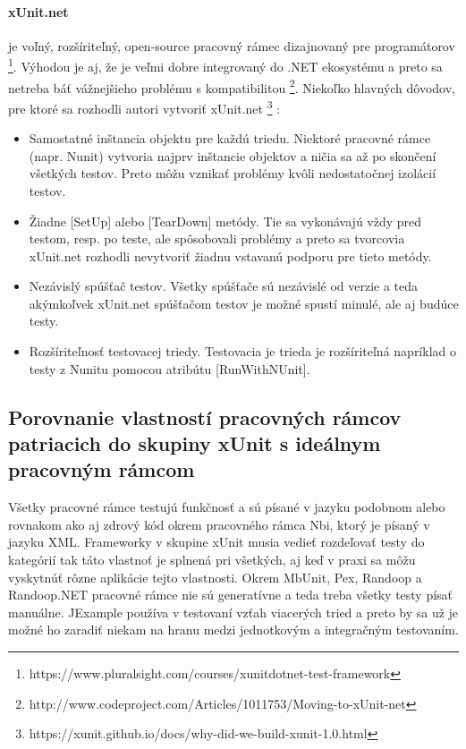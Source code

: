 \documentclass[11pt,twoside,slovak,a4paper]{article}
\begin{document}
		\paragraph{xUnit.net} je voľný, rozšíriteľný, open-source pracovný rámec dizajnovaný pre programátorov \footnote{https://www.pluralsight.com/courses/xunitdotnet-test-framework}.
		Výhodou je aj, že je veľmi dobre integrovaný do .NET ekosystému a preto sa netreba báť vážnejšieho problému s kompatibilitou \footnote{http://www.codeproject.com/Articles/1011753/Moving-to-xUnit-net}.
		Niekoľko hlavných dôvodov, pre ktoré sa rozhodli autori vytvoriť xUnit.net \footnote{https://xunit.github.io/docs/why-did-we-build-xunit-1.0.html} :
		\begin{itemize}
			\item Samostatné inštancia objektu pre každú triedu. Niektoré pracovné rámce (napr. Nunit) vytvoria najprv inštancie objektov a ničia sa až po skončení všetkých testov. Preto môžu vznikať problémy kvôli nedostatočnej izolácií testov.
			\item Žiadne [SetUp] alebo [TearDown] metódy. Tie sa vykonávajú vždy pred testom, resp. po teste, ale spôsobovali problémy a preto sa tvorcovia xUnit.net rozhodli nevytvoriť žiadnu vstavanú podporu pre tieto metódy.
			\item Nezávislý spúšťač testov. Všetky spúšťače sú nezávislé od verzie a teda akýmkoľvek xUnit.net spúšťačom testov je možné spustí minulé, ale aj budúce testy.
			\item Rozšíriteľnosť testovacej triedy. Testovacia je trieda je rozšíriteľná napríklad o testy z Nunitu pomocou atribútu [RunWithNUnit].
		\end{itemize}
		

	\subsection{Porovnanie vlastností pracovných rámcov patriacich do skupiny xUnit s ideálnym pracovným rámcom}
	
	Všetky pracovné rámce testujú funkčnosť a sú písané v jazyku podobnom alebo rovnakom ako aj zdrový kód okrem pracovného rámca Nbi, ktorý je písaný v jazyku XML. Frameworky v skupine xUnit musia vedieť rozdeľovať testy do kategórií tak táto vlastnoť je splnená pri všetkých, aj keď v praxi sa môžu vyskytnúť rôzne aplikácie tejto vlastnosti.
	Okrem MbUnit, Pex, Randoop a Randoop.NET pracovné rámce nie sú generatívne a teda treba všetky testy písať manuálne.
	JExample používa v testovaní vzťah viacerých tried a preto by sa už je možné ho zaradiť niekam na hranu medzi jednotkovým a integračným testovaním.
	
\end{document}
